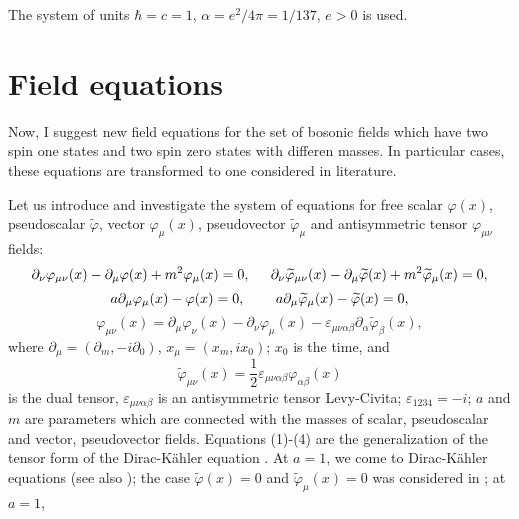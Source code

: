\documentclass[a4paper,12pt]{article}
\begin{document}
The system of units $\hbar =c=1$, $\alpha =e^2/4\pi =1/137$, $e>0$
is used.

\section{Field equations}

Now, I suggest new field equations for the set of bosonic fields
which have two spin one states and two spin zero states with
differen masses. In particular cases, these equations are
transformed to one considered in literature.

Let us introduce and investigate the system of equations for free
scalar $\varphi (x)$, pseudoscalar $\widetilde{\varphi }$, vector
$\varphi _\mu (x)$, pseudovector $\widetilde{\varphi }_\mu$ and
antisymmetric tensor $\varphi _{\mu \nu }$ fields:
\begin{equation}
\partial _\nu \varphi _{\mu \nu }(x)-\partial _\mu \varphi (x)+m^2\varphi _\mu
(x)=0 ,\hspace{0.2in}\partial _\nu \widetilde{\varphi }_{\mu \nu
}(x)-\partial _\mu \widetilde{\varphi }(x)+m^2\widetilde{\varphi
}_\mu (x)=0  ,\label{1}
\end{equation}
\begin{equation}
a\partial _\mu \varphi _\mu (x)-\varphi (x)=0
,\hspace{0.3in}a\partial _\mu \widetilde{ \varphi }_\mu
(x)-\widetilde{\varphi }(x)=0 , \label{2}
\end{equation}
\begin{equation}
\varphi _{\mu \nu }(x)=\partial _\mu \varphi _\nu (x)-\partial
_\nu \varphi _\mu (x)-\varepsilon _{\mu \nu \alpha \beta }\partial
_\alpha \widetilde{\varphi } _\beta (x) , \label{3}
\end{equation}
where $\partial_\mu=(\partial_m ,-i\partial_0)$, $x_\mu=(x_m
,ix_0)$; $x_0$ is the time, and
\begin{equation}
\widetilde{\varphi }_{\mu \nu }(x)=\frac 12\varepsilon _{\mu \nu
\alpha \beta }\varphi _{\alpha \beta }(x) \label{4}
\end{equation}
is the dual tensor, $\varepsilon _{\mu \nu \alpha \beta }$ is an
antisymmetric tensor Levy-Civita; $\varepsilon _{1234}=-i$; $a$
and $m$ are parameters which are connected with the masses of
scalar, pseudoscalar and vector, pseudovector fields. Equations
(1)-(4) are the generalization of the tensor form of the
Dirac-K\"ahler equation \cite{Kahler}. At $a=1$, we come to
Dirac-K\"ahler equations \cite{Kruglov1} (see also \cite{monogr});
the case $\widetilde{\varphi }(x)=0$ and  $\widetilde{ \varphi
}_\mu (x)=0$ was considered in \cite{Kruglov2}; at $a=1$,
\end{document}
